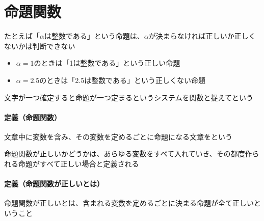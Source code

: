 \documentclass[../book_need-set-theory]{subfiles}
\begin{document}
\section{命題関数}

たとえば「$\alpha$は整数である」という命題は、$\alpha$が決まらなければ正しいか正しくないかは判断できない

\begin{itemize}
  \item $\alpha=1$のときは「1は整数である」という正しい命題
  \item $\alpha=2.5$のときは「2.5は整数である」という正しくない命題
\end{itemize}

文字が一つ確定すると命題が一つ定まるというシステムを関数と捉えてという

\begin{oframed}
  \paragraph{定義（命題関数）}
  文章中に変数を含み、その変数を定めるごとに命題になる文章をという
\end{oframed}

命題関数が正しいかどうかは、あらゆる変数をすべて入れていき、その都度作られる命題がすべて正しい場合と定義される

\begin{oframed}
  \paragraph{定義（命題関数が正しいとは）}
  命題関数が正しいとは、含まれる変数を定めるごとに決まる命題が全て正しいということ
\end{oframed}
\end{document}
